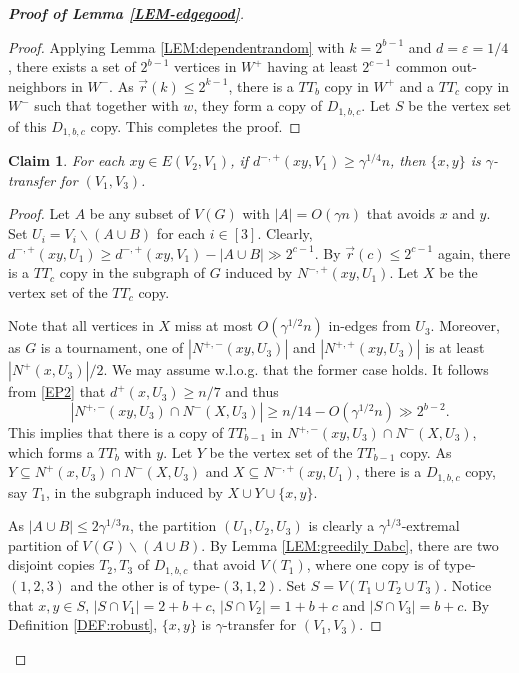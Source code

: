 \documentclass[11pt,a4paper,reqno]{amsart}
\newtheorem{claim}{Claim}
\theoremstyle{definition} %
\begin{document}
\begin{proof}[\textbf{Proof of Lemma \ref{LEM-edgegood}}]
\begin{proof}
 
Applying Lemma \ref{LEM:dependentrandom} with $k=2^{b-1}$ and $d=\varepsilon=1/4$,  there exists a set of $2^{b-1}$ vertices in $W^+$ having  at least  $2^{c-1}$ common out-neighbors in $W^-$.  As $\overrightarrow{r}(k)\leqslant 2^{k-1}$, there is a $TT_b$ copy in $W^+$ and a $TT_c$ copy in $W^-$ such that together with $w$, they form a copy of $D_{1,b,c}$. Let $S$ be the vertex set of this  $D_{1,b,c}$ copy. This completes the proof.
\end{proof}



\begin{claim}\label{Claim:three abc}
    For each $xy\in E(V_2,V_1)$, if $d^{-,+}(xy,V_1) \geqslant \gamma^{1/
    4}n$, then $\{x,y\}$ is $\gamma$-transfer for $(V_1,V_3)$.
\end{claim}


\begin{proof}
   Let $A$ be any subset of $V(G)$ with $|A|=O(\gamma n)$ that avoids $x$ and $y$. Set $U_i=V_i\backslash(A\cup B)$ for each $i\in[3]$. Clearly, $d^{-,+}(xy,U_1)\geqslant d^{-,+}(xy,V_1)-|A\cup B|\gg 2^{c-1}$. By $\overrightarrow{r}(c)\leqslant2^{c-1}$ again, there is a $TT_c$ copy in the subgraph of $G$ induced by $N^{-,+}(xy,U_1)$. Let $X$ be the vertex set of the $TT_c$ copy. 
   
   Note that  all vertices in $X$ miss at most $O(\gamma^{1/2} n)$ in-edges from $U_{3}$. Moreover, as $G$ is a tournament, one of $|N^{+,-}(xy,U_3)|$ and $|N^{+,+}(xy,U_3)|$ is at least $|N^{+}(x,U_3)|/2$. We may  assume w.l.o.g. that the former case holds. It follows from  \ref{EP2} that  $d^+(x,U_3)\geqslant n/7$ and thus  $$|N^{+,-}(xy,U_{3})\cap N^{-}(X,U_{3})| \geqslant n/14-O(\gamma^{1/2}n)\gg 2^{b-2}.$$
This implies that there is a copy of $TT_{b-1}$ in $N^{+,-}(xy,U_{3})\cap N^{-}(X,U_{3})$, which forms a $TT_{b}$ with $y$. Let $Y$ be the vertex set of the $TT_{b-1}$ copy. As $Y\subseteq  N^+(x,U_3)\cap N^{-}(X,U_{3})$ and $X\subseteq N^{-,+}(xy,U_1)$, there is a $D_{1,b,c}$ copy, say $T_1$, in the subgraph induced by $X\cup Y\cup \{x,y\}$.

As $|A\cup B|\leqslant 2\gamma^{1/3}n$, the partition $(U_1,U_2,U_3)$ is clearly a $\gamma^{1/3}$-extremal partition of $V(G)\backslash (A\cup B)$. By  Lemma \ref{LEM:greedily Dabc}, there are two disjoint copies $T_2,T_3$ of $D_{1,b,c}$ that avoid $V(T_1)$, where one copy is of type-$(1,2,3)$ and the other is of type-$(3,1,2)$. Set $S=V(T_1\cup T_2\cup T_3)$.  Notice that $x,y\in S$, $|S\cap V_1|=2+b+c$, $|S\cap V_2|=1+b+c$ and $|S\cap V_3|=b+c$. By Definition \ref{DEF:robust}, $\{x,y\}$ is $\gamma$-transfer for $(V_1,V_3)$.
\end{proof}




\end{proof}
\end{document}
